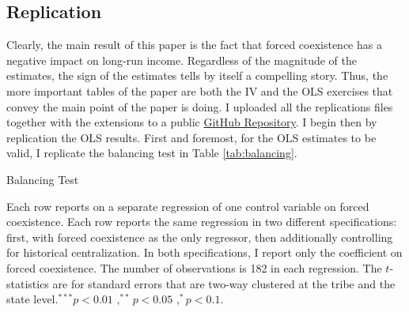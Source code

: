 \subsection*{Replication}
Clearly, the main result of this paper is the fact that forced coexistence has a negative impact on long-run income. Regardless of the magnitude of the estimates, the sign of the estimates tells by itself a compelling story. Thus, the more important tables of the paper are both the IV and the OLS exercises that convey the main point of the paper is doing. I uploaded all the replications files together with the extensions to a public \href{https://github.com/jmquintero925/EA3-Midterm-JMQ}{GitHub Repository}. I begin then by replication the OLS results. First and foremost, for the OLS estimates to be valid, I replicate the balancing test in Table \ref{tab:balancing}. 

\begin{table}[htb]
    \caption{\sc Balancing Test}
    \label{tab:balancing}
    \vspace{-15pt}
    
    \vspace{-10pt}
    \footnotesize{Each row reports on a separate regression of one control variable on forced coexistence. Each row reports the same regression in two different specifications: first, with forced coexistence as the only regressor, then additionally controlling for historical centralization. In both specifications, I report only the coefficient on forced coexistence. The number of observations is 182 in each regression. The $t$-statistics are for standard errors that are two-way clustered at the tribe and the state level$.^{***}p<0.01$ $,^{**} p<0.05$ $,^* p<0.1$.}
\end{table}
\FloatBarrier 

